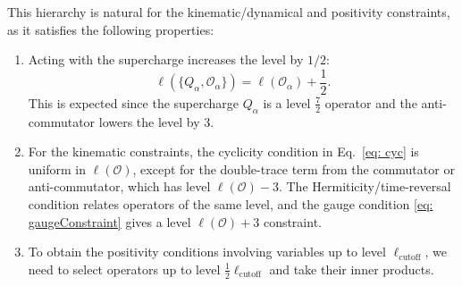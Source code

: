 \documentclass[11pt]{article}
\begin{document}
This hierarchy is natural for the kinematic/dynamical and positivity constraints, as it satisfies the following properties:

\begin{enumerate}
    \item Acting with the supercharge increases the level by $1/2$: %
    \begin{equation}
        \ell( \{Q_\alpha, \mathcal{O}_\alpha\} ) = \ell(\mathcal{O}_\alpha) + \frac{1}{2}.
    \end{equation}
    This is expected since the supercharge $Q_\alpha$ is a level $\frac{7}{2}$ operator and the anti-commutator lowers the level by 3.
    
    \item For the kinematic constraints, the cyclicity condition in Eq.~\eqref{eq: cyc} is uniform in $\ell(\mathcal{O})$, except for the double-trace term from the commutator or anti-commutator, which has level $\ell(\mathcal{O}) - 3$. The Hermiticity/time-reversal condition relates operators of the same level, and the gauge condition \eqref{eq: gaugeConstraint} gives a level %
    $\ell(\mathcal{O}) + 3$ constraint.%

    \item To obtain the positivity conditions involving variables up to level $\ell_\text{cutoff}$, we need to select operators up to level $\frac{1}{2} \ell_\text{cutoff}$ and take their inner products.
\end{enumerate}
\end{document}
